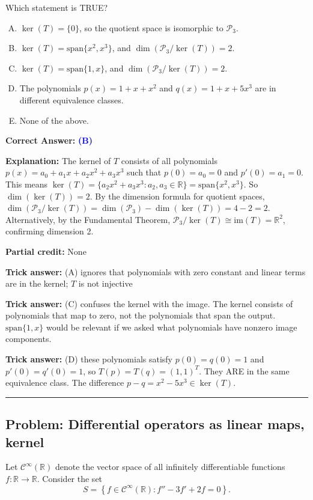 \documentclass[12pt]{amsart}
\newcommand{\divider}{
  \vspace{-1em}
  \noindent
  \raisebox{-0.15ex}{\textbullet}%
  \hspace{0.5em}%
  \rule[0.5ex]{0.95\textwidth}{1.0pt}%
  \hspace{0.5em}%
  \raisebox{-0.15ex}{\textbullet}%
  \vspace{0em}
}
\begin{document}
Which statement is TRUE?

\begin{enumerate}[(A)]
\item $\ker(T) = \{0\}$, so the quotient space is isomorphic to $\mathcal{P}_3$.
\item $\ker(T) = \text{span}\{x^2, x^3\}$, and $\dim(\mathcal{P}_3/\ker(T)) = 2$.
\item $\ker(T) = \text{span}\{1, x\}$, and $\dim(\mathcal{P}_3/\ker(T)) = 2$.
\item The polynomials $p(x) = 1 + x + x^2$ and $q(x) = 1 + x + 5x^3$ are in different equivalence classes.
\item None of the above.
\end{enumerate}

\textbf{Correct Answer:} \textcolor{blue}{\textbf{(B)}}

\textbf{Explanation:} The kernel of $T$ consists of all polynomials $p(x) = a_0 + a_1 x + a_2 x^2 + a_3 x^3$ such that $p(0) = a_0 = 0$ and $p'(0) = a_1 = 0$. This means $\ker(T) = \{a_2 x^2 + a_3 x^3 : a_2, a_3 \in \mathbb{R}\} = \text{span}\{x^2, x^3\}$. So $\dim(\ker(T)) = 2$. By the dimension formula for quotient spaces, $\dim(\mathcal{P}_3/\ker(T)) = \dim(\mathcal{P}_3) - \dim(\ker(T)) = 4 - 2 = 2$. Alternatively, by the Fundamental Theorem, $\mathcal{P}_3/\ker(T) \cong \text{im}(T) = \mathbb{R}^2$, confirming dimension 2.

\textbf{Partial credit:} None

\textbf{Trick answer:} (A) ignores that polynomials with zero constant and linear terms are in the kernel; $T$ is not injective

\textbf{Trick answer:} (C) confuses the kernel with the image. The kernel consists of polynomials that map to zero, not the polynomials that span the output. $\text{span}\{1, x\}$ would be relevant if we asked what polynomials have nonzero image components.

\textbf{Trick answer:} (D) these polynomials satisfy $p(0) = q(0) = 1$ and $p'(0) = q'(0) = 1$, so $T(p) = T(q) = (1, 1)^T$. They ARE in the same equivalence class. The difference $p - q = x^2 - 5x^3 \in \ker(T)$.

\divider

\subsection*{Problem: Differential operators as linear maps, kernel}

Let $\mathcal{C}^\infty(\mathbb{R})$ denote the vector space of all infinitely differentiable functions $f: \mathbb{R} \to \mathbb{R}$. Consider the set
$$S = \left\{ f \in \mathcal{C}^\infty(\mathbb{R}) : f'' - 3f' + 2f = 0 \right\}.$$
\end{document}
